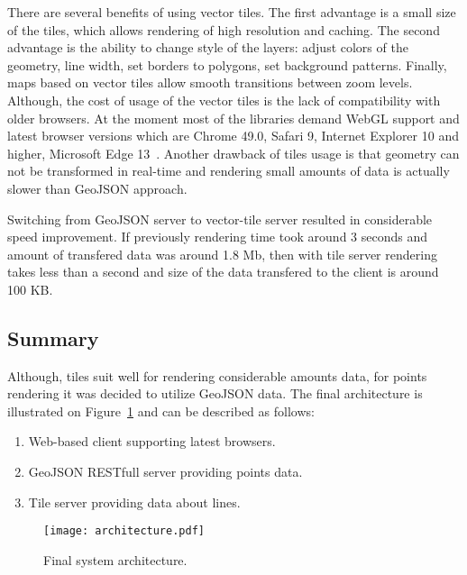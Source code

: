There are several benefits of using vector tiles. The first advantage is a small size of the tiles,
which allows rendering of high resolution and caching. The second advantage is the ability to change
style of the layers: adjust colors of the geometry, line width, set borders to polygons,
set background patterns. Finally, maps based on vector tiles allow smooth transitions between
zoom levels. Although, the cost of usage of the vector tiles is the lack of
compatibility with older browsers. At the moment most of the libraries demand WebGL support and
latest browser versions which are Chrome 49.0, Safari 9, Internet Explorer 10 and higher,
Microsoft Edge 13~\cite{google:support,mapbox:support}. Another drawback of tiles usage is
that geometry can not be transformed in real-time and rendering small amounts of data is actually
slower than GeoJSON approach.

Switching from GeoJSON server to vector-tile server resulted in considerable speed improvement.
If previously rendering time took around 3 seconds and amount of transfered data was around 1.8 Mb,
then with tile server rendering takes less than a second and size of the data transfered to the
client is around 100 KB.


\subsection{Summary}

Although, tiles suit well for rendering considerable amounts data, for points rendering it was
decided to utilize GeoJSON data. The final architecture is illustrated on
Figure~\ref{pic:architecture} and can be described as follows:

\begin{enumerate}
  \item Web-based client supporting latest browsers.
  \item GeoJSON RESTfull server providing points data.
  \item Tile server providing data about lines.
\end{enumerate}

\begin{figure}[t]
  \centering
  \texttt{[image: architecture.pdf]}
  \caption{Final system architecture.}
  \label{pic:architecture}
\end{figure}
